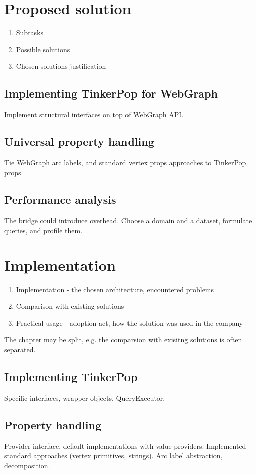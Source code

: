 \documentclass[times,specification,annotation,languages={russian,english}]{itmo-student-thesis}
\begin{document}
\chapter{Proposed solution}
\begin{enumerate}
    \item Subtasks
    \item Possible solutions
    \item Chosen solutions justification
\end{enumerate}

\section{Implementing TinkerPop for WebGraph}
Implement structural interfaces on top of WebGraph API.

\section{Universal property handling}
Tie WebGraph arc labels, and standard vertex props approaches to TinkerPop props.

\section{Performance analysis}
The bridge could introduce overhead. Choose a domain and a dataset, formulate queries, and profile them.

\chapter{Implementation}
\begin{enumerate}
    \item Implementation - the chosen architecture, encountered problems
    \item Comparison with existing solutions
    \item Practical usage - adoption act, how the solution was used in the company
\end{enumerate}
The chapter may be split, e.g. the comparsion with exisitng solutions is often separated.

\section{Implementing TinkerPop}
Specific interfaces, wrapper objects, QueryExecutor.

\section{Property handling}
Provider interface, default implementations with value providers.
Implemented standard approaches (vertex primitives, strings). Arc label abstraction, decomposition.
\end{document}
